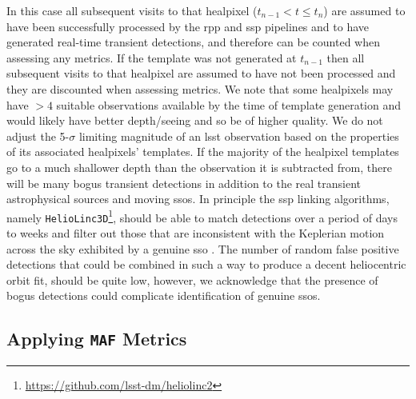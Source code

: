 \documentclass[preprintm,linenumbers]{aastex631}
\newcommand{\deltaNight}{\texttt{deltaNight}\xspace}
\newcommand{\maf}{\texttt{MAF}\xspace}
\newcommand{\heliolinc}{\texttt{HelioLinc3D}\xspace}
\begin{document}
In this case all subsequent visits to that healpixel ($t_{n-1}< t \leq t_n$) are assumed to have been successfully processed by the \gls*{rpp} and \gls*{ssp} pipelines and to have generated real-time transient detections, and therefore can be counted when assessing any metrics.
If the template was not generated at $t_{n-1}$ then all subsequent visits to that healpixel are assumed to have not been processed and they are discounted when assessing metrics.
We note that some healpixels may have $>4$ suitable observations available by the time of template generation and would likely have better depth/seeing and so be of higher quality. 
  We do not adjust the 5-$\sigma$ limiting magnitude of an \gls*{lsst} observation based on the properties of its associated healpixels' templates. 
If the majority of the healpixel templates go to a much shallower depth than the observation it is subtracted from, there will be many bogus transient detections in addition to the real transient astrophysical sources and moving \glspl*{sso}. 
In principle the \gls*{ssp} linking algorithms, namely \heliolinc\footnote{\url{https://github.com/lsst-dm/heliolinc2}}, should be able to match detections over a period of days to weeks and filter out those that are inconsistent with the Keplerian motion across the sky exhibited by a genuine \gls*{sso} \citep{holmanHelioLinCNovelApproach2018,heinze2022}.
The number of random false positive detections that could be combined in such a way to produce a decent heliocentric orbit fit, should be quite low, however, we acknowledge that the presence of bogus detections could complicate identification of genuine \glspl*{sso}. 
		
		
		\subsection{Applying \maf Metrics}
  \label{sec:applying_maf_metrics}
		
\end{document}
